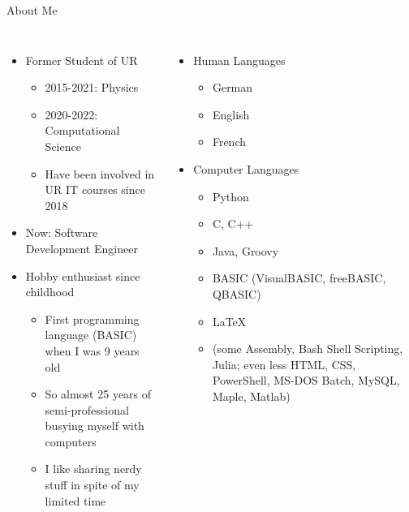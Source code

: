 
\begin{frame}[t,plain]
\titlepage
\end{frame}


\begin{frame}{About Me}
%
\begin{columns}
\begin{itemize}
\item Former Student of UR
	\begin{itemize}
	\item 2015-2021: Physics
	\item 2020-2022: Computational Science
	\item Have been involved in UR IT courses since 2018
	\end{itemize}
\item Now: Software Development Engineer
\item Hobby enthusiast since childhood
	\begin{itemize}
	\item First programming language (BASIC) when I was 9 years old
	\item So almost 25 years of semi-professional busying myself with computers
	\item I like sharing nerdy stuff in spite of my limited time
	\end{itemize}
\end{itemize}
%
\begin{itemize}
\item Human Languages
	\begin{itemize}
	\item German
	\item English
	\item French
	\end{itemize}
\item Computer Languages
	\begin{itemize}
	\item Python
	\item C, C++
	\item Java, Groovy
	\item BASIC (VisualBASIC, freeBASIC, QBASIC)
	\item \LaTeX
	\item (some Assembly, Bash Shell Scripting, Julia; even less HTML, CSS, PowerShell, MS-DOS Batch, MySQL, Maple, Matlab)
	\end{itemize}
\end{itemize}
\end{columns}
%
\end{frame}

